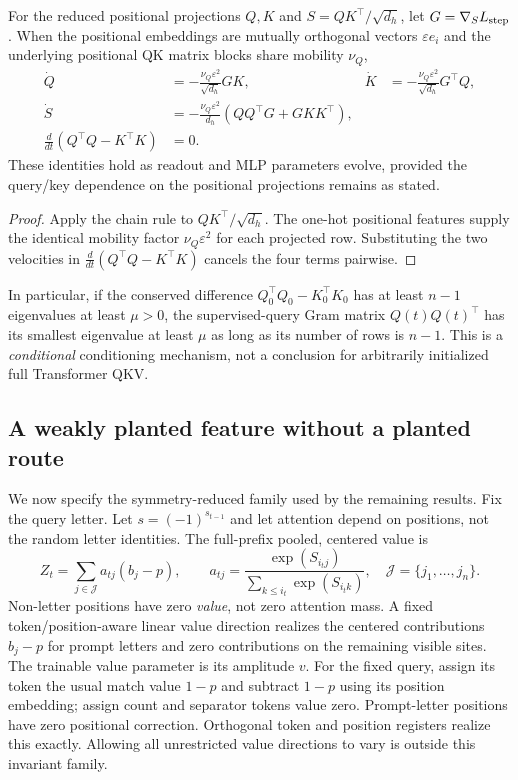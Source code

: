 \begin{lrlemma}
\label{lem:lr-qk-geometry}
For the reduced positional projections $Q,K$ and
$S=QK^\top/\sqrt{d_h}$, let $G=\nabla_SL_{\mathrm{step}}$.
When the positional embeddings are mutually orthogonal vectors
$\varepsilon e_i$ and the underlying positional QK matrix blocks share
mobility $\nu_Q$,
\begin{align}
 \dot Q&=-\frac{\nu_Q\varepsilon^2}{\sqrt{d_h}}GK,
 &\dot K&=-\frac{\nu_Q\varepsilon^2}{\sqrt{d_h}}G^\top Q,\label{eq:lr-qk-flow}\\
 \dot S&=-\frac{\nu_Q\varepsilon^2}{d_h}
 (QQ^\top G+GKK^\top),\label{eq:lr-qk-scoreflow}\\
 \frac{d}{dt}(Q^\top Q-K^\top K)&=0.\label{eq:lr-balanced-conservation}
\end{align}
These identities hold as readout and MLP parameters evolve, provided the
query/key dependence on the positional projections remains as stated.
\end{lrlemma}
\begin{proof}
Apply the chain rule to $QK^\top/\sqrt{d_h}$.  The one-hot positional
features supply the identical mobility factor $\nu_Q\varepsilon^2$ for
each projected row.  Substituting the two velocities in
$\frac{d}{dt}(Q^\top Q-K^\top K)$ cancels the four terms pairwise.
\end{proof}

In particular, if the conserved difference
$Q_0^\top Q_0-K_0^\top K_0$ has at least $n-1$ eigenvalues at least
$\mu>0$, the supervised-query Gram matrix $Q(t)Q(t)^\top$ has its
smallest eigenvalue at least $\mu$ as long as its number of rows is $n-1$.
This is a \emph{conditional} conditioning mechanism, not a conclusion for
arbitrarily initialized full Transformer QKV.

\subsection{A weakly planted feature without a planted route}
\label{app:weak-routing-family}

We now specify the symmetry-reduced family used by the remaining results.
Fix the query letter. Let $s=(-1)^{s_{t-1}}$ and let attention depend on positions, not the
random letter identities.  The full-prefix pooled, centered value is
\begin{equation}\label{eq:lr-centered-value}
 Z_t=\sum_{j\in\mathcal J}a_{tj}(b_j-p),\qquad
 a_{tj}=\frac{\exp(S_{i_tj})}{\sum_{k\le i_t}\exp(S_{i_tk})},
 \quad \mathcal J=\{j_1,\ldots,j_n\}.
\end{equation}
Non-letter positions have zero \emph{value}, not zero attention mass.
A fixed token/position-aware linear value direction realizes the centered contributions
$b_j-p$ for prompt letters and zero contributions on the remaining visible
sites.  The trainable value parameter is its amplitude $v$. For the fixed query, assign its token the usual match
value $1-p$ and subtract $1-p$ using its position embedding; assign count
and separator tokens value zero. Prompt-letter positions have zero positional
correction. Orthogonal token and position registers realize this exactly.
Allowing all
unrestricted value directions to vary is outside this invariant family.

